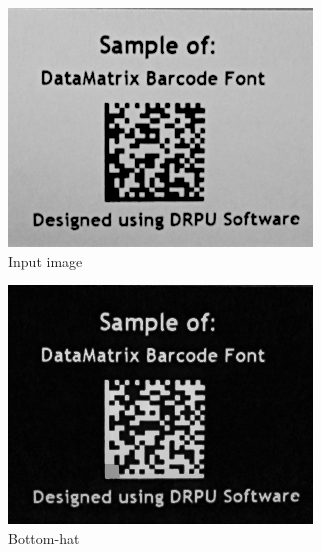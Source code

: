 \documentclass[runningheads,a4paper]{llncs}
\begin{document}
\begin{figure}
  \centering
\begin{subfigure}{.3\textwidth}
  \centering
  \includegraphics[width=\linewidth]{images/first}
  \caption{Input image}
  \label{fig:sfig1}
\end{subfigure}
\begin{subfigure}{.3\textwidth}
  \centering
  \includegraphics[width=\linewidth]{images/second}
  \caption{Bottom-hat}
  \label{fig:sfig2}
\end{subfigure}
\begin{subfigure}{.3\textwidth}
  \centering

\end{subfigure}
\end{figure}
\end{document}

